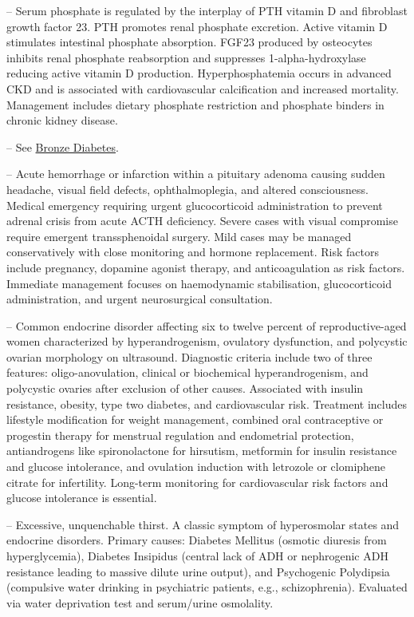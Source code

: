 -- Serum phosphate is regulated by the interplay of PTH vitamin D and fibroblast growth factor 23. PTH promotes renal phosphate excretion. Active vitamin D stimulates intestinal phosphate absorption. FGF23 produced by osteocytes inhibits renal phosphate reabsorption and suppresses 1-alpha-hydroxylase reducing active vitamin D production. Hyperphosphatemia occurs in advanced CKD and is associated with cardiovascular calcification and increased mortality. Management includes dietary phosphate restriction and phosphate binders in chronic kidney disease.

-- See \hyperlink{Bronze Diabetes}{Bronze Diabetes}.

-- Acute hemorrhage or infarction within a pituitary adenoma causing sudden headache, visual field defects, ophthalmoplegia, and altered consciousness. Medical emergency requiring urgent glucocorticoid administration to prevent adrenal crisis from acute ACTH deficiency. Severe cases with visual compromise require emergent transsphenoidal surgery. Mild cases may be managed conservatively with close monitoring and hormone replacement. Risk factors include pregnancy, dopamine agonist therapy, and anticoagulation as risk factors. Immediate management focuses on haemodynamic stabilisation, glucocorticoid administration, and urgent neurosurgical consultation.

-- Common endocrine disorder affecting six to twelve percent of reproductive-aged women characterized by hyperandrogenism, ovulatory dysfunction, and polycystic ovarian morphology on ultrasound. Diagnostic criteria include two of three features: oligo-anovulation, clinical or biochemical hyperandrogenism, and polycystic ovaries after exclusion of other causes. Associated with insulin resistance, obesity, type two diabetes, and cardiovascular risk. Treatment includes lifestyle modification for weight management, combined oral contraceptive or progestin therapy for menstrual regulation and endometrial protection, antiandrogens like spironolactone for hirsutism, metformin for insulin resistance and glucose intolerance, and ovulation induction with letrozole or clomiphene citrate for infertility. Long-term monitoring for cardiovascular risk factors and glucose intolerance is essential.

-- Excessive, unquenchable thirst. A classic symptom of hyperosmolar states and endocrine disorders. Primary causes: Diabetes Mellitus (osmotic diuresis from hyperglycemia), Diabetes Insipidus (central lack of ADH or nephrogenic ADH resistance leading to massive dilute urine output), and Psychogenic Polydipsia (compulsive water drinking in psychiatric patients, e.g., schizophrenia). Evaluated via water deprivation test and serum/urine osmolality.

